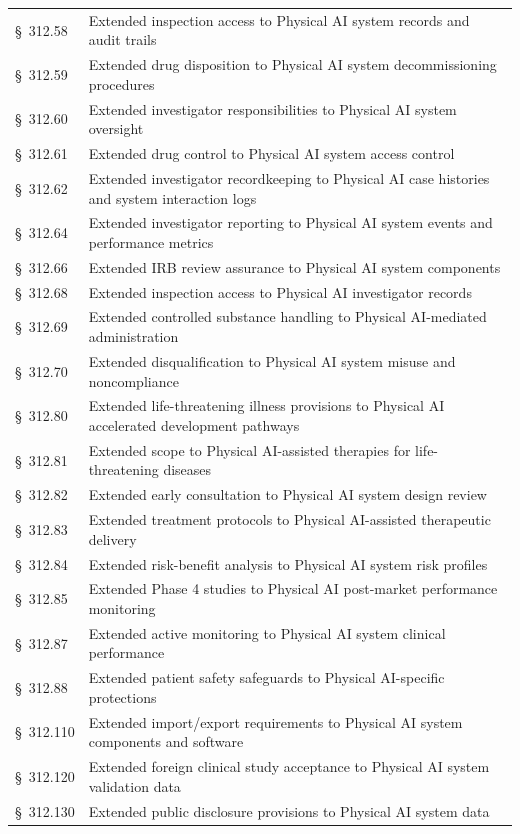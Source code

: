 \documentclass[11pt]{article}
\begin{document}
\begin{longtable}{>{\raggedright\arraybackslash}p{2.2cm} >{\raggedright\arraybackslash}p{11.5cm}}
\S~312.58 & Extended inspection access to Physical AI system records and audit trails \\
\S~312.59 & Extended drug disposition to Physical AI system decommissioning procedures \\
\S~312.60 & Extended investigator responsibilities to Physical AI system oversight \\
\S~312.61 & Extended drug control to Physical AI system access control \\
\S~312.62 & Extended investigator recordkeeping to Physical AI case histories and system interaction logs \\
\S~312.64 & Extended investigator reporting to Physical AI system events and performance metrics \\
\S~312.66 & Extended IRB review assurance to Physical AI system components \\
\S~312.68 & Extended inspection access to Physical AI investigator records \\
\S~312.69 & Extended controlled substance handling to Physical AI-mediated administration \\
\S~312.70 & Extended disqualification to Physical AI system misuse and noncompliance \\
\S~312.80 & Extended life-threatening illness provisions to Physical AI accelerated development pathways \\
\S~312.81 & Extended scope to Physical AI-assisted therapies for life-threatening diseases \\
\S~312.82 & Extended early consultation to Physical AI system design review \\
\S~312.83 & Extended treatment protocols to Physical AI-assisted therapeutic delivery \\
\S~312.84 & Extended risk-benefit analysis to Physical AI system risk profiles \\
\S~312.85 & Extended Phase 4 studies to Physical AI post-market performance monitoring \\
\S~312.87 & Extended active monitoring to Physical AI system clinical performance \\
\S~312.88 & Extended patient safety safeguards to Physical AI-specific protections \\
\S~312.110 & Extended import/export requirements to Physical AI system components and software \\
\S~312.120 & Extended foreign clinical study acceptance to Physical AI system validation data \\
\S~312.130 & Extended public disclosure provisions to Physical AI system data \\

\end{longtable}
\end{document}
